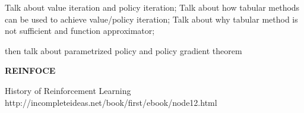 \documentclass{article}
\begin{document}
Talk about value iteration and policy iteration;
Talk about how tabular methods can be used to achieve
value/policy iteration;
Talk about why tabular method is not sufficient and function 
approximator;

then talk about parametrized policy and policy gradient theorem 



\textbf{REINFOCE}



History of Reinforcement Learning
http://incompleteideas.net/book/first/ebook/node12.html
\end{document}
